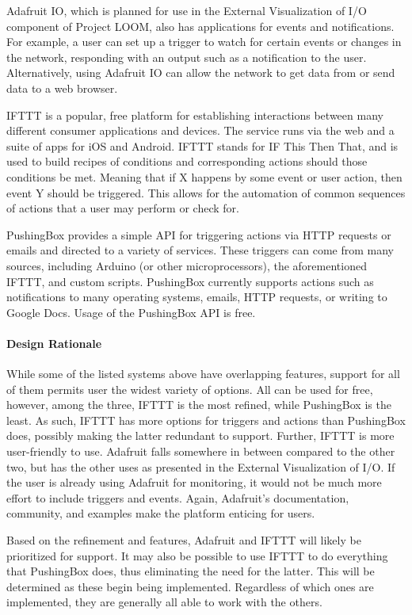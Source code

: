 \documentclass[onecolumn, draftclsnofoot,10pt, compsoc]{IEEEtran}
\begin{document}
    Adafruit IO, which is planned for use in the External Visualization of I/O component of Project LOOM, also has applications for events and notifications. For example, a user can set up a trigger to watch for certain events or changes in the network, responding with an output such as a notification to the user. Alternatively, using Adafruit IO can allow the network to get data from or send data to a web browser. \cite{adafruitio}

    IFTTT is a popular, free platform for establishing interactions between many different consumer applications and devices. The service runs via the web and a suite of apps for iOS and Android. IFTTT stands for IF This Then That, and is used to build recipes of conditions and corresponding actions should those conditions be met. Meaning that if X happens by some event or user action, then event Y should be triggered. This allows for the automation of common sequences of actions that a user may perform or check for. \cite{ifttt}

    PushingBox provides a simple API for triggering actions via HTTP requests or emails and directed to a variety of services. These triggers can come from many sources, including Arduino (or other microprocessors), the aforementioned IFTTT, and custom scripts. PushingBox currently supports actions such as notifications to many operating systems, emails, HTTP requests, or writing to Google Docs. Usage of the PushingBox API is free. \cite{pushingbox}

\paragraph{Design Rationale}
    While some of the listed systems above have overlapping features, support for all of them permits user the widest variety of options. All can be used for free, however, among the three, IFTTT is the most refined, while PushingBox is the least. As such, IFTTT has more options for triggers and actions than PushingBox does, possibly making the latter redundant to support. Further, IFTTT is more user-friendly to use. Adafruit falls somewhere in between compared to the other two, but has the other uses as presented in the External Visualization of I/O. If the user is already using Adafruit for monitoring, it would not be much more effort to include triggers and events. Again, Adafruit's documentation, community, and examples make the platform enticing for users.

    Based on the refinement and features, Adafruit and IFTTT will likely be prioritized for support. It may also be possible to use IFTTT to do everything that PushingBox does, thus eliminating the need for the latter. This will be determined as these begin being implemented. Regardless of which ones are implemented, they are generally all able to work with the others.
\end{document}
